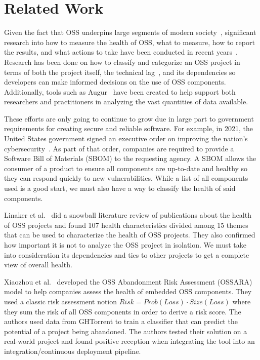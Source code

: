 \documentclass[sn-mathphys-num]{sn-jnl}%
\theoremstyle{thmstyleone}%
\theoremstyle{thmstyletwo}%
\theoremstyle{thmstylethree}%
\begin{document}
\section{Related Work}
Given the fact that OSS underpins large segments of modern society~\cite{miller_we_2023, goggins_open_2021, guizani_rules_2023}, significant research into how to measure the health of OSS, what to measure, how to report the results, and what actions to take have been conducted in recent years~\cite{noauthor_chaoss_nodate}. Research has been done on how to classify and categorize an OSS project in terms of both the project itself, the technical lag~\cite{decan2018evolution, gonzalez2017technical}, and its dependencies so developers can make informed decisions on the use of OSS components. Additionally, tools such as Augur~\cite{goggins_open_2021} have been created to help support both researchers and practitioners in analyzing the vast quantities of data available.

These efforts are only going to continue to grow due in large part to government requirements for creating secure and reliable software. For example, in 2021, the United States government signed an executive order on improving the nation's cybersecurity~\cite{house_executive_2021}. As part of that order, companies are required to provide a Software Bill of Materials (SBOM) to the requesting agency. A SBOM allows the consumer of a product to ensure all components are up-to-date and healthy so they can respond quickly to new vulnerabilities. While a list of all components used is a good start, we must also have a way to classify the health of said components.

Linaker et al.~\cite{linaker_how_2022} did a snowball literature review of publications about the health of OSS projects and found 107 health characteristics divided among 15 themes that can be used to characterize the health of OSS projects. They also confirmed how important it is not to analyze the OSS project in isolation. We must take into consideration its dependencies and ties to other projects to get a complete view of overall health.

Xiaozhou et al.~\cite{li_ossara_2022} developed the OSS Abandonment Risk Assessment (OSSARA) model to help companies assess the health of embedded OSS components. They used a classic risk assessment notion $Risk = Prob(Loss) \cdot Size(Loss)$ where they sum the risk of all OSS components in order to derive a risk score. The authors used data from GHTorrent to train a classifier that can predict the potential of a project being abandoned. The authors tested their solution on a real-world project and found positive reception when integrating the tool into an integration/continuous deployment pipeline.
\end{document}
